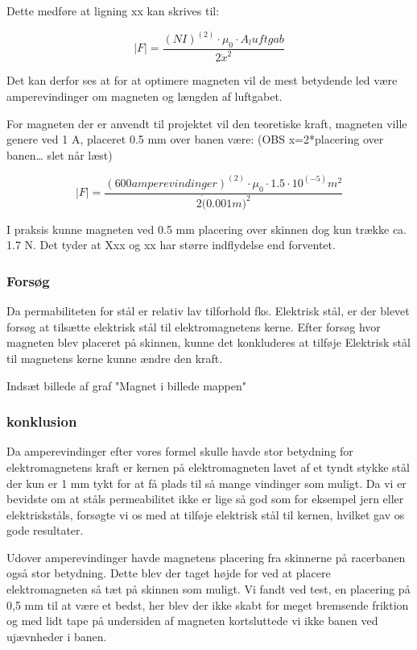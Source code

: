 Dette medføre at ligning xx kan skrives til:

\begin{equation}

\mid F \mid = \frac{(NI)^(2) \cdot \mu_0 \cdot A_luftgab } {2 \dot x^2}

\end{equation}

Det kan derfor ses at for at optimere magneten vil de mest betydende led være amperevindinger om magneten og længden af luftgabet.

For magneten der er anvendt til projektet vil den teoretiske kraft, magneten ville genere ved 1 A, placeret 0.5 mm over banen være: (OBS x=2*placering over banen… slet når læst)

\begin{equation}

\mid F \mid = \frac{(600 amperevindinger)^(2) \cdot \mu_0 \cdot 1.5 \cdot 10^(-5) m^2 } {2 \dot (0.001m)^2}

\end{equation}

I praksis kunne magneten ved 0.5 mm placering over skinnen dog kun trække ca. 1.7 N. Det tyder at Xxx og xx har større indflydelse end forventet.

\subsubsection{Forsøg}
Da permabiliteten for stål er relativ lav tilforhold fks. Elektrisk stål, er der blevet forsøg at tilsætte elektrisk stål til elektromagnetens kerne. Efter forsøg hvor magneten blev placeret på skinnen, kunne det konkluderes at tilføje Elektrisk stål til magnetens kerne kunne ændre den kraft.

Indsæt billede af graf "Magnet i billede mappen"

\subsubsection{konklusion}
Da amperevindinger efter vores formel skulle havde stor betydning for elektromagnetens kraft er kernen på elektromagneten lavet af et tyndt stykke stål der kun er 1 mm tykt for at få plads til så mange vindinger som muligt.  Da vi er bevidste om at ståls permeabilitet ikke er lige så god som for eksempel jern eller elektriskståls, forsøgte vi os med at tilføje elektrisk stål til kernen, hvilket gav os gode resultater. 

Udover amperevindinger havde magnetens placering fra skinnerne på racerbanen også stor betydning. Dette blev der taget højde for ved at placere elektromagneten så tæt på skinnen som muligt. Vi fandt ved test, en placering på 0,5 mm til at være et bedst, her blev der ikke skabt for meget bremsende friktion og med lidt tape på undersiden af magneten kortsluttede vi ikke banen ved ujævnheder i banen.
